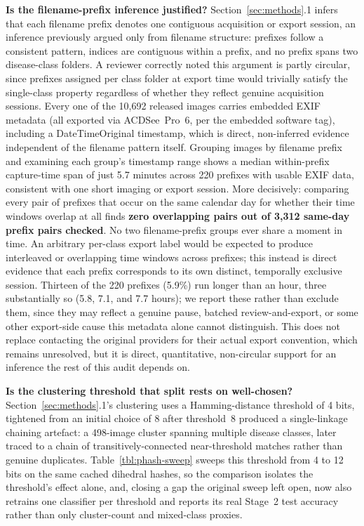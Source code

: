 \textbf{Is the filename-prefix inference justified?} Section~\ref{sec:methods}.1 infers that each filename prefix denotes one contiguous acquisition or export session, an inference previously argued only from filename structure: prefixes follow a consistent pattern, indices are contiguous within a prefix, and no prefix spans two disease-class folders. A reviewer correctly noted this argument is partly circular, since prefixes assigned per class folder at export time would trivially satisfy the single-class property regardless of whether they reflect genuine acquisition sessions. Every one of the 10,692 released images carries embedded EXIF metadata (all exported via ACDSee~Pro~6, per the embedded software tag), including a DateTimeOriginal timestamp, which is direct, non-inferred evidence independent of the filename pattern itself. Grouping images by filename prefix and examining each group's timestamp range shows a median within-prefix capture-time span of just 5.7 minutes across 220 prefixes with usable EXIF data, consistent with one short imaging or export session. More decisively: comparing every pair of prefixes that occur on the same calendar day for whether their time windows overlap at all finds \textbf{zero overlapping pairs out of 3,312 same-day prefix pairs checked}. No two filename-prefix groups ever share a moment in time. An arbitrary per-class export label would be expected to produce interleaved or overlapping time windows across prefixes; this instead is direct evidence that each prefix corresponds to its own distinct, temporally exclusive session. Thirteen of the 220 prefixes (5.9\%) run longer than an hour, three substantially so (5.8, 7.1, and 7.7 hours); we report these rather than exclude them, since they may reflect a genuine pause, batched review-and-export, or some other export-side cause this metadata alone cannot distinguish. This does not replace contacting the original providers for their actual export convention, which remains unresolved, but it is direct, quantitative, non-circular support for an inference the rest of this audit depends on.

\textbf{Is the clustering threshold that split rests on well-chosen?} Section~\ref{sec:methods}.1's clustering uses a Hamming-distance threshold of 4 bits, tightened from an initial choice of 8 after threshold~8 produced a single-linkage chaining artefact: a 498-image cluster spanning multiple disease classes, later traced to a chain of transitively-connected near-threshold matches rather than genuine duplicates. Table~\ref{tbl:phash-sweep} sweeps this threshold from 4 to 12 bits on the same cached dihedral hashes, so the comparison isolates the threshold's effect alone, and, closing a gap the original sweep left open, now also retrains one classifier per threshold and reports its real Stage~2 test accuracy rather than only cluster-count and mixed-class proxies.

